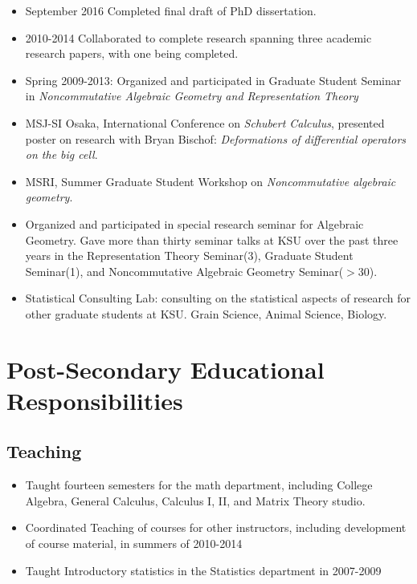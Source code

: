 \documentclass[a4paper,10pt,notitlepage]{article}
\begin{document}
	\begin{itemize}

	\vspace{-5pt}\item September 2016 Completed final draft of PhD dissertation.
	\vspace{-5pt}\item 2010-2014 Collaborated to complete research spanning three academic research papers, with one being completed.

	\vspace{-5pt}\item Spring 2009-2013: Organized and participated in Graduate Student Seminar in \textit{Noncommutative Algebraic Geometry and Representation Theory}

	\vspace{-5pt}\item	MSJ-SI Osaka, International Conference on \emph{Schubert Calculus}, presented poster on research with Bryan Bischof: \emph{Deformations of differential operators on the big cell}.

	\vspace{-5pt}\item	MSRI, Summer Graduate Student Workshop on \emph{Noncommutative algebraic geometry}.


	\vspace{-5pt}\item 	Organized and participated in special research seminar for Algebraic Geometry. Gave more than thirty seminar talks at KSU over the past three years in the Representation Theory Seminar(3), Graduate Student Seminar(1), and Noncommutative Algebraic Geometry Seminar($>30$).

	\vspace{-5pt}\item 	Statistical Consulting Lab: consulting on the statistical aspects of research for other graduate students at KSU. Grain Science, Animal Science, Biology.
	\end{itemize}


	\vspace{-10pt}\section*{Post-Secondary Educational Responsibilities}
	\vspace{-7pt}\subsection*{Teaching} \begin{itemize} \vspace{-5pt}\item Taught fourteen semesters for the math department, including College Algebra, General Calculus, Calculus I, II, and Matrix Theory studio. \vspace{-5pt}\item Coordinated Teaching of courses for other instructors, including development of course material, in summers of 2010-2014 \item Taught Introductory statistics in the Statistics department in 2007-2009 \end{itemize}
\end{document}
